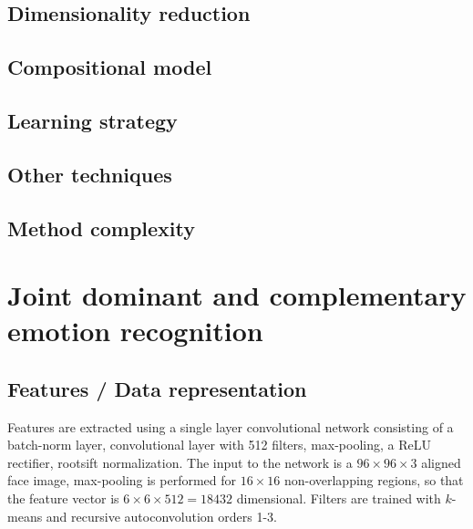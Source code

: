 \documentclass{article}
\begin{document}
\subsection{Dimensionality reduction}

\subsection{Compositional model}

\subsection{Learning strategy}

\subsection{Other techniques}

\subsection{Method complexity}


\section{Joint dominant and complementary emotion recognition}
\subsection{Features / Data representation}
Features are extracted using a single layer convolutional network consisting of a batch-norm layer, convolutional layer with 512 filters, max-pooling, a ReLU rectifier, rootsift normalization. 
The input to the network is a $96\times96\times3$ aligned face image, max-pooling is performed for $16\times16$ non-overlapping regions, so that the feature vector is $6\times6\times512=18432$ dimensional.
Filters are trained with $k$-means and recursive autoconvolution orders 1-3.
\end{document}
